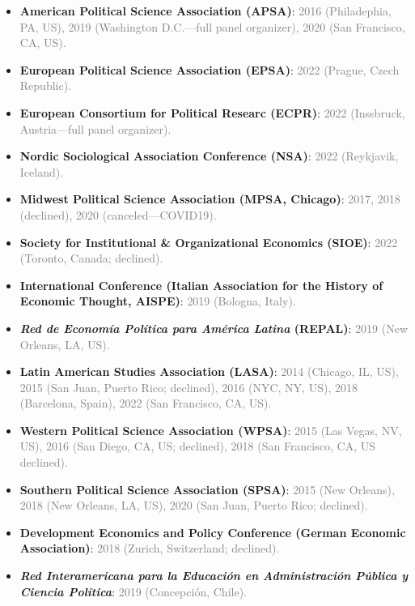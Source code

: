 \begin{itemize}
\item[\textcolor{gray}{\textbullet}] {\bf American Political Science Association (APSA)}: \textcolor{gray}{2016 (Philadephia, PA, US), 2019 (Washington D.C.---full panel organizer), 2020 (San Francisco, CA, US).}
\item[\textcolor{gray}{\textbullet}] {\bf European Political Science Association (EPSA)}: \textcolor{gray}{2022 (Prague, Czech Republic).}
\item[\textcolor{gray}{\textbullet}] {\bf European Consortium for Political Researc (ECPR)}: \textcolor{gray}{2022 (Inssbruck, Austria---full panel organizer).}
\item[\textcolor{gray}{\textbullet}] {\bf Nordic Sociological Association Conference (NSA)}: \textcolor{gray}{2022 (Reykjavik, Iceland).}
\item[\textcolor{gray}{\textbullet}] {\bf Midwest Political Science Association (MPSA, Chicago)}: \textcolor{gray}{2017, 2018 (declined), 2020 (canceled---COVID19).}
\item[\textcolor{gray}{\textbullet}] {\bf Society for Institutional \& Organizational Economics (SIOE)}: \textcolor{gray}{2022 (Toronto, Canada; declined).}
\item[\textcolor{gray}{\textbullet}] {\bf International Conference (Italian Association for the History of Economic Thought, AISPE)}: \textcolor{gray}{2019 (Bologna, Italy).}
\item[\textcolor{gray}{\textbullet}] {\bf \emph{Red de Econom\'ia Pol\'itica para Am\'erica Latina} (REPAL)}: \textcolor{gray}{2019 (New Orleans, LA, US).}
\item[\textcolor{gray}{\textbullet}] {\bf Latin American Studies Association (LASA)}: \textcolor{gray}{2014 (Chicago, IL, US), 2015 (San Juan, Puerto Rico; declined), 2016 (NYC, NY, US), 2018 (Barcelona, Spain), 2022 (San Francisco, CA, US).}
\item[\textcolor{gray}{\textbullet}] {\bf Western Political Science Association (WPSA)}: \textcolor{gray}{2015 (Las Vegas, NV, US), 2016 (San Diego, CA, US; declined), 2018 (San Francisco, CA, US declined).}
\item[\textcolor{gray}{\textbullet}] {\bf Southern Political Science Association (SPSA)}: \textcolor{gray}{2015 (New Orleans), 2018 (New Orleans, LA, US), 2020 (San Juan, Puerto Rico; declined).}
\item[\textcolor{gray}{\textbullet}] {\bf Development Economics and Policy Conference (German Economic Association)}: \textcolor{gray}{2018 (Zurich, Switzerland; declined).}
\item[\textcolor{gray}{\textbullet}] {\bf \emph{Red Interamericana para la Educaci\'on en Administraci\'on P\'ublica y Ciencia Pol\'itica}}: \textcolor{gray}{2019 (Concepci\'on, Chile).}
\end{itemize}

